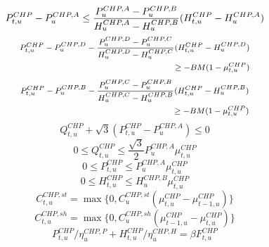 \documentclass[journal,twoside,web]{ieeecolor}
\begin{document}
\begin{equation}\label{chpab}\footnotesize
        P^{CHP}_{t,u}-P^{CHP,A}_u\le \frac{P^{CHP,A}_u-P^{CHP,B}_u}{H^{CHP,A}_u-H^{CHP,B}_u}(H^{CHP}_{t,u}-H^{CHP,A}_u)
\end{equation}
\begin{equation}\footnotesize\label{chpcd}\begin{split}
        P^{CHP}_{t,u}-P^{CHP,D}_u -\frac{P^{CHP,D}_u-P^{CHP,C}_u}{H^{CHP,D}_u-H^{CHP,C}_u}(H^{CHP}_{t,u}-H^{CHP,D}_u)\\ \ge -BM(1-\mu^{CHP}_{t,u})
\end{split}\end{equation}
\begin{equation}\footnotesize\label{chpbc}\begin{split}
        P^{CHP}_{t,u}-P^{CHP,B}_u -\frac{P^{CHP,C}_u-P^{CHP,B}_u}{H^{CHP,C}_u-H^{CHP,B}_u}(H^{CHP}_{t,u}-H^{CHP,B}_u)\\ \ge -BM(1-\mu^{CHP}_{t,u})
\end{split}\end{equation}
\begin{equation}\label{hex1}
    Q^{CHP}_{t,u} + \sqrt{3}(P^{CHP}_{t,u}-P^{CHP,A}_u) \le 0
\end{equation}
\begin{equation}\label{hex2}
    0\le Q^{CHP}_{t,u}\le \frac{\sqrt{3}}{2}P^{CHP,A}_u\mu^{CHP}_{t,u}
\end{equation}
\begin{equation}\label{pbnd}
    0 \le P^{CHP}_{t,u} \le P^{CHP,A}_u\mu^{CHP}_{t,u}
\end{equation}
\begin{equation}\label{hbnd}
    0 \le H^{CHP}_{t,u} \le H^{CHP,B}_u\mu^{CHP}_{t,u}
\end{equation}
\begin{equation}\label{chpst}
    C^{CHP,st}_{t,u}=\max \{0,C^{CHP,st}_u(\mu^{CHP}_{t,u}-\mu^{CHP}_{t-1,u})\} 
\end{equation}
\begin{equation}\label{chpsh}
    C^{CHP,sh}_{t,u}=\max \{0,C^{CHP,sh}_u(\mu^{CHP}_{t-1,u}-\mu^{CHP}_{t,u})\} 
\end{equation}
\begin{equation}\label{fuel}
    P^{CHP}_{t,u}/\eta^{CHP,P}_u+H^{CHP}_{t,u}/\eta^{CHP,H}_u=\beta F^{CHP}_{t,u}
\end{equation}
\end{document}
